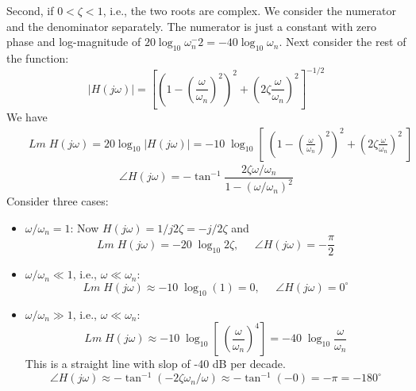 \documentclass{article}
\begin{document}
\begin{enumerate}
  Second, if $0<\zeta<1$, i.e., the two roots are complex. We consider the numerator 
  and the denominator separately. The numerator is just a constant with zero phase and
  log-magnitude of $20\log_{10} \omega_n^{-}2=-40\log_{10} \omega_n$. Next consider the
  rest of the function:
  \begin{equation} |H(j\omega)|=[(1-(\frac{\omega}{\omega_n})^2)^2+(2\zeta\frac{\omega}{\omega_n})^2]^{-1/2}\end{equation}
  We have
  \begin{eqnarray}
    && Lm\;H(j\omega)=20\log_{10} |H(j\omega)|
    =-10\;\log_{10}[\; (1-(\frac{\omega}{\omega_n})^2)^2+(2\zeta\frac{\omega}{\omega_n})^2\;]
  \end{eqnarray}
  \begin{equation} \angle H(j\omega)=-\tan^{-1}\frac{2\zeta\omega/\omega_n}{1-(\omega/\omega_n)^2} \end{equation}
  Consider three cases:
  \begin{itemize}
  \item $\omega/\omega_n=1$:
    Now $H(j\omega)=1/j2\zeta=-j/2\zeta$ and 
    \begin{equation} Lm\;H(j\omega)=-20\;\log_{10} 2\zeta,\;\;\;\;\;\angle H(j\omega)=-\frac{\pi}{2} \end{equation}
  \item $\omega/\omega_n\ll 1$, i.e., $\omega \ll \omega_n$:
    \begin{equation} Lm\;H(j\omega) \approx -10\;\log_{10} (1)=0,\;\;\;\;\;\angle H(j\omega)=0^\circ \end{equation}
  \item $\omega/\omega_n\gg 1$, i.e., $\omega \ll \omega_n$:
    \begin{equation} Lm\;H(j\omega)\approx-10\;\log_{10}[\; (\frac{\omega}{\omega_n})^4 ]
    =-40 \;\log_{10} \frac{\omega}{\omega_n}    \end{equation}
    This is a straight line with slop of -40 dB per decade.
    \begin{equation} \angle H(j\omega) \approx -\tan^{-1} (-2\zeta \omega_n/\omega)
    \approx -\tan^{-1} (-0)=-\pi=-180^\circ \end{equation}
  \end{itemize}

\end{enumerate}

\end{document}
